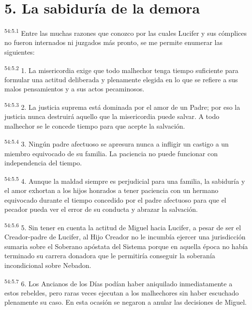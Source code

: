 \section*{5. La sabiduría de la demora}
\par
\textsuperscript{54:5.1} Entre las muchas razones que conozco por las cuales Lucifer y sus cómplices no fueron internados ni juzgados más pronto, se me permite enumerar las siguientes:

\par
\textsuperscript{54:5.2} 1. La misericordia exige que todo malhechor tenga tiempo suficiente para formular una actitud deliberada y plenamente elegida en lo que se refiere a sus malos pensamientos y a sus actos pecaminosos.

\par
\textsuperscript{54:5.3} 2. La justicia suprema está dominada por el amor de un Padre; por eso la justicia nunca destruirá aquello que la misericordia puede salvar. A todo malhechor se le concede tiempo para que acepte la salvación.

\par
\textsuperscript{54:5.4} 3. Ningún padre afectuoso se apresura nunca a infligir un castigo a un miembro equivocado de su familia. La paciencia no puede funcionar con independencia del tiempo.

\par
\textsuperscript{54:5.5} 4. Aunque la maldad siempre es perjudicial para una familia, la sabiduría y el amor exhortan a los hijos honrados a tener paciencia con un hermano equivocado durante el tiempo concedido por el padre afectuoso para que el pecador pueda ver el error de su conducta y abrazar la salvación.

\par
\textsuperscript{54:5.6} 5. Sin tener en cuenta la actitud de Miguel hacia Lucifer, a pesar de ser el Creador-padre de Lucifer, al Hijo Creador no le incumbía ejercer una jurisdicción sumaria sobre el Soberano apóstata del Sistema porque en aquella época no había terminado su carrera donadora que le permitiría conseguir la soberanía incondicional sobre Nebadon.

\par
\textsuperscript{54:5.7} 6. Los Ancianos de los Días podían haber aniquilado inmediatamente a estos rebeldes, pero raras veces ejecutan a los malhechores sin haber escuchado plenamente su caso. En esta ocasión se negaron a anular las decisiones de Miguel.

